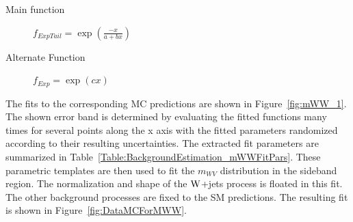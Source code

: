 \begin{description}
	\item [Main function] $f_{ExpTail} = \exp(\frac{-x}{a+bx})$
	\item [Alternate Function] $f_{Exp} = \exp(cx)$
\end{description}

The fits to the corresponding MC predictions are shown in Figure~\ref{fig:mWW_1}. The shown error band is determined by evaluating the fitted functions many times for several points along the x axis with the fitted parameters randomized according to their resulting uncertainties. The extracted fit parameters are summarized in Table~\ref{Table:BackgroundEstimation_mWWFitPars}. These parametric templates are then used to fit the $m_{WV}$ distribution in the sideband region. The normalization and shape of the  $\mathrm{W}$+jets process is floated in this fit. The other background processes are fixed to the SM predictions. The resulting fit is shown in Figure~\ref{fig:DataMCForMWW}.

